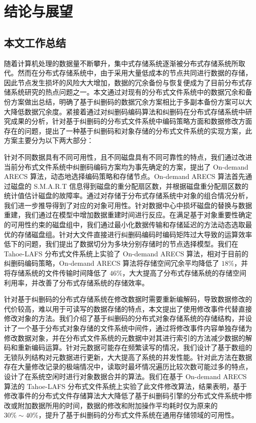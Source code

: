 \chapter{结论与展望}
\section{本文工作总结}
随着计算机处理的数据量不断攀升，集中式存储系统逐渐被分布式存储系统所取代。然而在分布式存储系统中，由于采用大量低成本的节点共同进行数据的存储，因此节点发生损坏的风险大大增加，数据的冗余备份与恢复便成为了目前分布式存储系统研究的热点问题之一。本文通过对现有的分布式文件系统中的数据冗余和备份方案做出总结，明确了基于纠删码的数据冗余方案相比于多副本备份方案可以大大降低数据冗余度。紧接着通过对纠删码编码算法和纠删码在分布式存储系统中研究成果的分析，针对基于纠删码的分布式文件系统中编码策略方面和数据修改方面存在的问题，提出了一种基于纠删码和对象存储的分布式文件系统的实现方案，此方案主要分为以下两大部分：

针对不同数据具有不同可用性，且不同磁盘具有不同可靠性的特点，我们通过改进当前分布式文件系统中纠删码编码方案均为事先确定的方案，提出了 On-demand ARECS 算法，动态地选择编码策略和存储节点。On-demand ARECS 算法首先通过磁盘的 S.M.A.R.T 信息得到磁盘的重分配扇区数，并根据磁盘重分配扇区数的统计值估计磁盘的故障率。通过对存储于分布式存储系统中对象的组合情况分析，我们进一步推导得到了对应的对象可用性。针对数据中心中损坏磁盘的替换与数据重建，我们通过在模型中增加数据重建时间进行反应。在满足基于对象重要性确定的可用性约束的磁盘组中，我们通过最小化数据传输和存储延迟的方法动态选取最优的存储磁盘组。针对大文件直接进行纠删码编码时编码矩阵过大导致的运算效率低下的问题，我们提出了数据切分为多块分别存储时的节点选择模型。我们在 Tahoe-LAFS 分布式文件系统上实验了 On-demand ARECS 算法，相对于目前的纠删码编码策略，On-demand ARECS 算法将存储空间冗余平均降低了 $18\%$，并将存储系统的文件传输时间降低了 $46\%$，大大提高了分布式存储系统的存储空间利用率，并改善了分布式存储系统的存储效率。

针对基于纠删码的分布式存储系统在修改数据时需要重新编解码，导致数据修改的代价较高，难以用于可读写的数据存储的特点，本文提出了使用修改事件代替直接修改对象的方法。我们介绍了基于纠删码的分布式对象存储系统的存储结构，并设计了一个基于分布式对象存储的文件系统中间件，通过将修改事件内容单独存储为修改数据对象，并在分布式文件系统的元数据中对其进行索引的方法减少数据的解码和重新编码运算。针对元数据可能存在频繁读写的情况，我们设计了基于数组的无锁队列结构对元数据进行更新，大大提高了系统的并发性能。针对此方法在数据存在大量修改记录的极端情况中，读取时最坏情况遍历比较次数可能过多的特点，设计了在系统空闲时进行对象数据合并的算法。我们在基于 On-demand ARECS 算法的 Tahoe-LAFS 分布式文件系统上实验了此文件修改算法，结果表明，基于修改事件的分布式文件存储算法大大降低了基于纠删码引擎的分布式文件系统中修改或附加数据所用的时间，数据的修改和附加操作平均耗时仅为原来的 $30\%\sim40\%$，提升了基于纠删码的分布式文件系统在通用存储领域的可用性。
